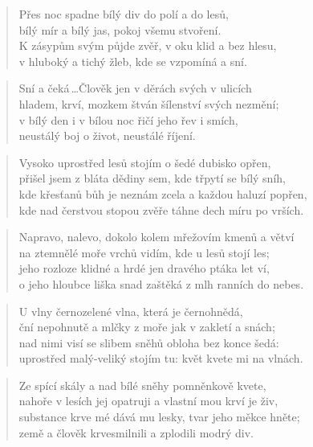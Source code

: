 \documentclass{book}
\begin{document}
\begin{verse}
Přes noc spadne bílý div do polí a do lesů,\\
bílý mír a bílý jas, pokoj všemu stvoření.\\
K zásypům svým půjde zvěř, v oku klid a bez hlesu,\\
v hluboký a tichý žleb, kde se vzpomíná a sní.
\end{verse}
\begin{verse}
Sní a čeká\,\ldots Člověk jen v děrách svých v ulicích\\
hladem, krví, mozkem štván šílenství svých nezmění;\\
v bílý den i v bílou noc řičí jeho řev i smích,\\
neustálý boj o život, neustálé říjení.
\end{verse}
\newpage
{}
\begin{verse}
Vysoko uprostřed lesů stojím o šedé dubisko opřen,\\
přišel jsem z bláta dědiny sem, kde třpytí se bílý sníh,\\
kde křesťanů bůh je neznám zcela a každou haluzí popřen,\\
kde nad čerstvou stopou zvěře táhne dech míru po vrších.
\end{verse}
\begin{verse}
Napravo, nalevo, dokolo kolem mřežovím kmenů a větví\\
na ztemnělé moře vrchů vidím, kde u lesů stojí les;\\
jeho rozloze klidné a hrdé jen dravého ptáka let ví,\\
o jeho hloubce liška snad zaštěká z mlh ranních do nebes.
\end{verse}
\begin{verse}
U vlny černozelené vlna, která je černohnědá,\\
ční nepohnutě a mlčky z moře jak v zakletí a snách;\\
nad nimi visí se slibem sněhů obloha bez konce šedá:\\
uprostřed malý-veliký stojím tu: květ kvete mi na vlnách.
\end{verse}
\begin{verse}
Ze spící skály a nad bílé sněhy pomněnkově kvete,\\
nahoře v lesích jej opatruji a vlastní mou krví je živ,\\
substance krve mé dává mu lesky, tvar jeho měkce hněte;\\
země a člověk krvesmilnili a zplodili modrý div.\\
\end{verse}
\end{document}
